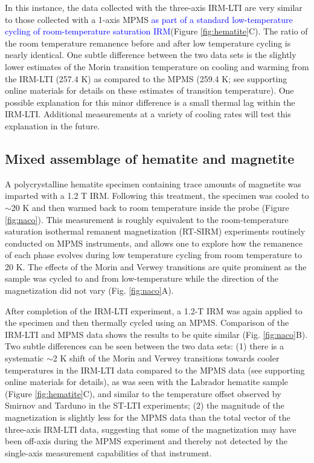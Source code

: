 \documentclass[draft,gc]{AGUTeX}
\begin{document}
\begin{article}
In this instance, the data collected with the three-axis IRM-LTI are very similar to those collected with a 1-axis MPMS \textcolor{blue}{as part of a standard low-temperature cycling of room-temperature saturation IRM}(Figure \ref{fig:hematite}C).  The ratio of the room temperature remanence before and after low temperature cycling is nearly identical. One subtle difference between the two data sets is the slightly lower estimates of the Morin transition temperature on cooling and warming from the IRM-LTI (257.4 K) as compared to the MPMS (259.4 K; see supporting online materials for details on these estimates of transition temperature).  One possible explanation for this minor difference is a small thermal lag within the IRM-LTI. Additional measurements at a variety of cooling rates will test this explanation in the future.    

\subsection{Mixed assemblage of hematite and magnetite}

A polycrystalline hematite specimen containing trace amounts of magnetite was imparted with a 1.2 T IRM. Following this treatment, the specimen was cooled to $\sim$20 K and then warmed back to room temperature inside the probe (Figure \ref{fig:naco}). This measurement is roughly equivalent to the room-temperature saturation isothermal remanent magnetization (RT-SIRM) experiments routinely conducted on MPMS instruments, and allows one to explore how the remanence of each phase evolves during low temperature cycling from room temperature to 20 K. The effects of the Morin and Verwey transitions are quite prominent as the sample was cycled to and from low-temperature while the direction of the magnetization did not vary (Fig. \ref{fig:naco}A).

After completion of the IRM-LTI experiment, a 1.2-T IRM was again applied to the specimen and then thermally cycled using an MPMS. Comparison of the IRM-LTI and MPMS data shows the results to be quite similar (Fig. \ref{fig:naco}B). Two subtle differences can be seen between the two data sets: (1) there is a systematic $\sim$2 K shift of the Morin and Verwey transitions towards cooler temperatures in the IRM-LTI data compared to the MPMS data (see supporting online materials for details), as was seen with the Labrador hematite sample (Figure \ref{fig:hematite}C), and similar to the temperature offset observed by Smirnov and Tarduno in the ST-LTI experiments; (2) the magnitude of the magnetization is slightly less for the MPMS data than the total vector of the three-axis IRM-LTI data, suggesting that some of the magnetization may have been off-axis during the MPMS experiment and thereby not detected by the single-axis measurement capabilities of that instrument.


\end{article}
\end{document}
